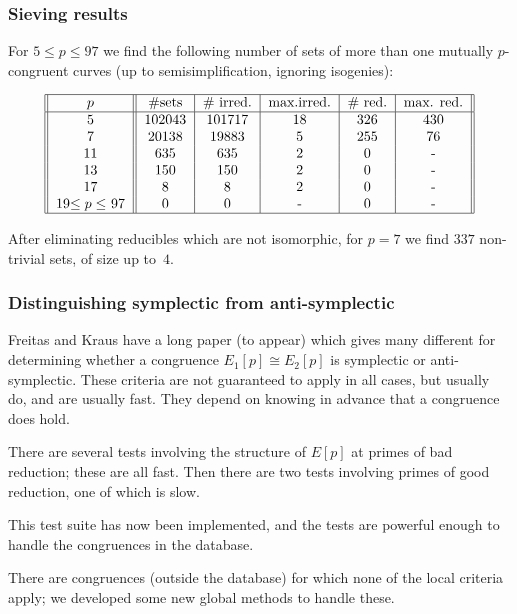 \documentclass[handout]{beamer}
\newcommand{\high}[1]{\emph{\color{blue}{#1}}}
\begin{document}
\begin{frame}\frametitle{Sieving results}
  For $5\le p\le 97$ we find the following number of sets of more than
  one mutually $p$-congruent curves (up to semisimplification,
  ignoring isogenies):

  \[
  \begin{tabular}{||c||c|c|c|c|c||}
    \hline
    $p$ & \#sets & \# irred. & max.irred. & \# red. & max. red.\\
    \hline
    5 & 102043 & 101717 & 18 & 326 & 430 \\
    7 & 20138 & 19883 & 5 & 255 & 76 \\
    11 & 635 & 635 & 2 & 0 & - \\
    13 & 150 & 150 & 2 & 0 & - \\
    17 & 8 & 8 & 2 & 0 & - \\
    19$\le p\le$ 97 & 0 & 0 & - & 0 & - \\
    \hline
  \end{tabular}
  \]

After eliminating reducibles which are not isomorphic, for $p=7$ we
find $337$ non-trivial sets, of size up to~$4$.
\end{frame}

\begin{frame}\frametitle{Distinguishing symplectic from
    anti-symplectic}

  Freitas and Kraus have a long paper (to appear) which gives many different
  \high{local criteria} for determining whether a congruence
  $E_1[p]\cong E_2[p]$ is symplectic or anti-symplectic.  These
  criteria are not guaranteed to apply in all cases, but usually do,
  and are usually fast.  They depend on knowing in advance that a
  congruence does hold.

\pause\medskip

  There are several tests involving the structure of $E[p]$ at primes
  of bad reduction; these are all fast.  Then there are two tests
  involving primes of good reduction, one of which is slow.

\pause\medskip

  This test suite has now been implemented, and the tests are powerful
  enough to handle \high{all} the congruences in the database.\pause

  There are congruences (outside the database) for which none of the
  local criteria apply; we developed some new global methods to handle
  these.

\end{frame}
\end{document}

